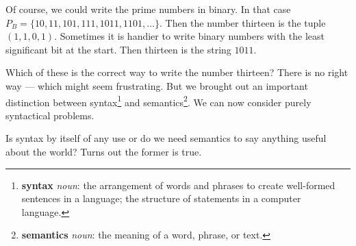 \documentclass{iansnotes}
\begin{document}
  Of course, we could write the prime numbers in binary.
  In that case $P_B = \{ 10, 11, 101, 111, 1011, 1101, \ldots \}$.
  Then the number thirteen is the tuple $(1,1,0,1)$.
  Sometimes it is handier to write binary numbers with the least significant bit at the start.
  Then thirteen is the string $1011$.

  Which of these is the correct way to write the number thirteen?
  There is no right way --- which might seem frustrating.
  But we brought out an important distinction between syntax\footnote{\textbf{syntax} \emph{noun}: the arrangement of words and phrases to create well-formed sentences in a language; the structure of statements in a computer language.} and semantics\footnote{\textbf{semantics} \emph{noun}: the meaning of a word, phrase, or text.}.
  We can now consider purely syntactical problems.
  
  Is syntax by itself of any use or do we need semantics to say anything useful about the world?
  Turns out the former is true.
\end{document}
